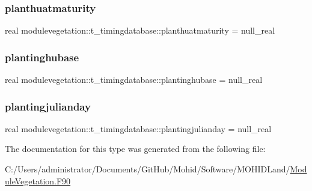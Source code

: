 \subsubsection{\texorpdfstring{planthuatmaturity}{planthuatmaturity}}
{\footnotesize\ttfamily real modulevegetation\+::t\+\_\+timingdatabase\+::planthuatmaturity = null\+\_\+real\hspace{0.3cm}{\ttfamily [private]}}

\mbox{\label{structmodulevegetation_1_1t__timingdatabase_a54e1d7869c6c518f9a47f3fce52a1f27}} 
\subsubsection{\texorpdfstring{plantinghubase}{plantinghubase}}
{\footnotesize\ttfamily real modulevegetation\+::t\+\_\+timingdatabase\+::plantinghubase = null\+\_\+real\hspace{0.3cm}{\ttfamily [private]}}

\mbox{\label{structmodulevegetation_1_1t__timingdatabase_a4e0f2b1ad6c23f9e45a7e50814e21173}} 
\subsubsection{\texorpdfstring{plantingjulianday}{plantingjulianday}}
{\footnotesize\ttfamily real modulevegetation\+::t\+\_\+timingdatabase\+::plantingjulianday = null\+\_\+real\hspace{0.3cm}{\ttfamily [private]}}



The documentation for this type was generated from the following file\+:\begin{DoxyCompactItemize}
\item 
C\+:/\+Users/administrator/\+Documents/\+Git\+Hub/\+Mohid/\+Software/\+M\+O\+H\+I\+D\+Land/\mbox{\hyperlink{_module_vegetation_8_f90}{Module\+Vegetation.\+F90}}\end{DoxyCompactItemize}
